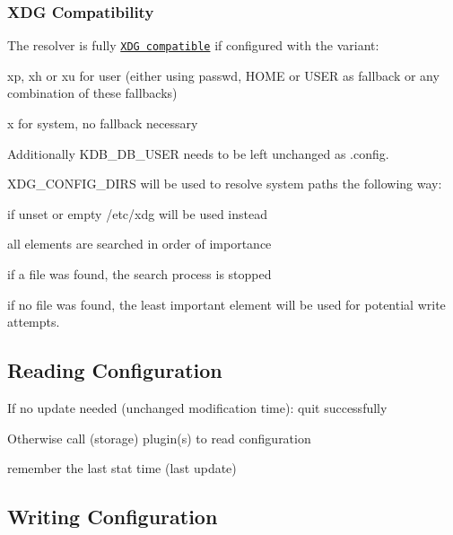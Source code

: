 \subsubsection*{X\+DG Compatibility}

The resolver is fully \href{http://standards.freedesktop.org/basedir-spec/basedir-spec-latest.html}{\tt X\+DG compatible} if configured with the variant\+:


\begin{DoxyItemize}
\item xp, xh or xu for user (either using passwd, H\+O\+ME or U\+S\+ER as fallback or any combination of these fallbacks)
\item x for system, no fallback necessary
\end{DoxyItemize}

Additionally {\ttfamily K\+D\+B\+\_\+\+D\+B\+\_\+\+U\+S\+ER} needs to be left unchanged as {\ttfamily .config}.

{\ttfamily X\+D\+G\+\_\+\+C\+O\+N\+F\+I\+G\+\_\+\+D\+I\+RS} will be used to resolve system paths the following way\+:


\begin{DoxyItemize}
\item if unset or empty {\ttfamily /etc/xdg} will be used instead
\item all elements are searched in order of importance
\begin{DoxyItemize}
\item if a file was found, the search process is stopped
\item if no file was found, the least important element will be used for potential write attempts.
\end{DoxyItemize}
\end{DoxyItemize}

\subsection*{Reading Configuration}


\begin{DoxyEnumerate}
\item If no update needed (unchanged modification time)\+: quit successfully
\item Otherwise call (storage) plugin(s) to read configuration
\item remember the last stat time (last update)
\end{DoxyEnumerate}

\subsection*{Writing Configuration}

